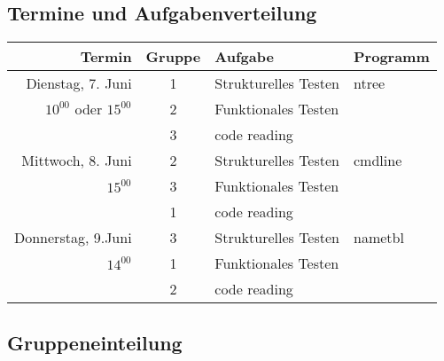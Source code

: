 \subsection*{Termine und Aufgabenverteilung}

\begin{center}
\begin{tabular}{|r|c|l|l|}
\hline
\bf Termin    & \bf Gruppe  & \bf Aufgabe & Programm\\
\hline
Dienstag, 7. Juni         &  1          &  Strukturelles Testen  &  ntree\\
$10^{00}$ oder $15^{00}$  &  2          &  Funktionales  Testen  & \\
                          &  3          &  code reading          & \\
\hline
Mittwoch, 8. Juni         &  2          &  Strukturelles Testen  & cmdline \\
$15^{00}$                 &  3          &  Funktionales  Testen  & \\
                          &  1          &  code reading          & \\
\hline
Donnerstag, 9.Juni        &  3          &  Strukturelles Testen  & nametbl \\
$14^{00}$                 &  1          &  Funktionales  Testen  & \\
                          &  2          &  code reading          & \\
\hline
\end{tabular}
\end{center}


\subsection*{Gruppeneinteilung}

